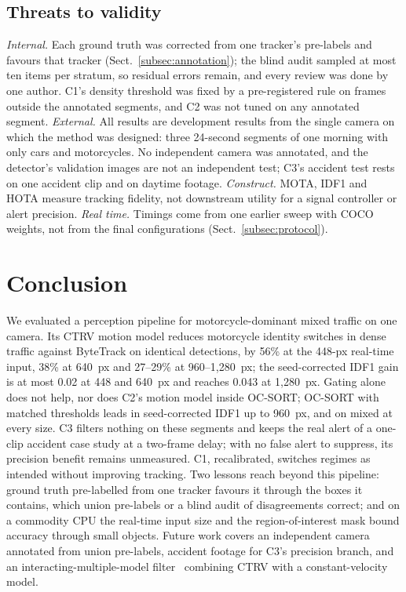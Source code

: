 \documentclass[twocolumn]{svjour3}
\begin{document}
\subsection{Threats to validity}\label{subsec:threats}

\emph{Internal.} Each ground truth was corrected from one tracker's pre-labels
and favours that tracker (Sect.~\ref{subsec:annotation}); the blind audit
sampled at most ten items per stratum, so residual errors remain, and every
review was done by one author. C1's density threshold was fixed by a
pre-registered rule on frames outside the annotated segments, and C2 was not
tuned on any annotated segment.
\emph{External.} All results are development results from the single camera on
which the method was designed: three 24-second segments of one morning with
only cars and motorcycles. No independent camera was annotated, and the
detector's validation images are not an independent test; C3's accident test
rests on one accident clip and on daytime footage. \emph{Construct.}
MOTA, IDF1 and HOTA measure tracking fidelity, not downstream utility for a
signal controller or alert precision. \emph{Real time.} Timings come from one
earlier sweep with COCO weights, not from the final configurations
(Sect.~\ref{subsec:protocol}).

\section{Conclusion}\label{sec:conclusion}

We evaluated a perception pipeline for
motorcycle-dominant mixed traffic on one camera. Its CTRV motion model reduces
motorcycle identity switches in dense traffic against ByteTrack on identical
detections, by 56\% at the 448-px real-time input, 38\% at 640~px and 27--29\%
at 960--1,280~px; the seed-corrected IDF1 gain is at most 0.02 at 448 and
640~px and reaches 0.043 at 1,280~px. Gating alone does not help, nor does C2's
motion model inside OC-SORT; OC-SORT with matched thresholds leads in
seed-corrected IDF1 up to 960~px, and on mixed at every size. C3 filters
nothing on these segments and keeps the real alert of a one-clip accident case
study at a two-frame delay; with no false alert to suppress, its precision
benefit remains unmeasured. C1, recalibrated, switches
regimes as intended without improving tracking. Two lessons reach beyond this pipeline: ground truth
pre-labelled from one tracker favours it through the boxes it contains, which
union pre-labels or a blind audit of disagreements correct; and on a commodity
CPU the real-time input size and the region-of-interest mask bound accuracy
through small objects. Future work covers an
independent camera annotated from union pre-labels, accident footage for C3's
precision branch, and an
interacting-multiple-model filter~\cite{Blom1988_imm} combining CTRV with a
constant-velocity model.
\end{document}
